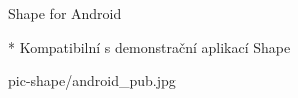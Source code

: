 \sec Shape for Android

* Kompatibilní s demonstrační aplikací Shape
\nl

\centerline{\picw=14cm \inspic pic-shape/android_pub.jpg }
